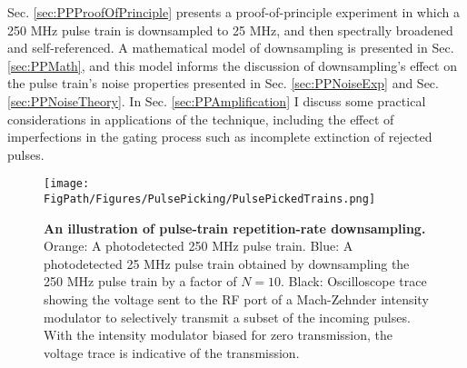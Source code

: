 Sec. \ref{sec:PPProofOfPrinciple} presents a proof-of-principle experiment in which a 250 MHz pulse train is downsampled to 25 MHz, and then spectrally broadened and self-referenced. A mathematical model of downsampling is presented in Sec. \ref{sec:PPMath}, and this model informs the discussion of downsampling's effect on the pulse train's noise properties presented in Sec. \ref{sec:PPNoiseExp} and Sec. \ref{sec:PPNoiseTheory}. In Sec. \ref{sec:PPAmplification} I discuss some practical considerations in applications of the technique, including the effect of imperfections in the gating process such as incomplete extinction of rejected pulses.



\begin{figure}[htpb]
	\begin{center}
		\texttt{[image: \\FigPath/Figures/PulsePicking/PulsePickedTrains.png]}
	\end{center}
	\caption[An illustration of pulse-train repetition-rate downsmapling]{\textbf{An illustration of pulse-train repetition-rate downsampling.} Orange: A photodetected 250 MHz pulse train. Blue: A photodetected 25 MHz pulse train obtained by downsampling the 250 MHz pulse train by a factor of $N=10$. Black: Oscilloscope trace showing the voltage sent to the RF port of a Mach-Zehnder intensity modulator to selectively transmit a subset of the incoming pulses. With the intensity modulator biased for zero transmission, the voltage trace is indicative of the transmission.}
	\label{fig:PPConcept}
\end{figure} 






